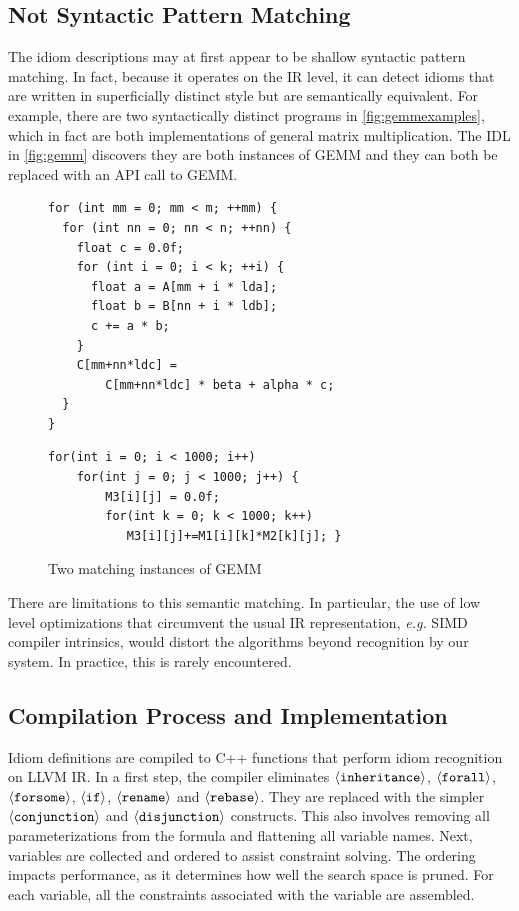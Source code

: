 \subsection{Not Syntactic Pattern Matching}
The idiom descriptions may at first appear to be shallow syntactic pattern matching.
In fact, because it operates on the IR level, it can detect idioms that are written in superficially distinct style but are semantically equivalent.
For example, there are two syntactically distinct programs in \autoref{fig:gemmexamples}, which in fact are both implementations of general matrix multiplication.
The IDL in \autoref{fig:gemm} discovers they are both instances of GEMM and they can both be replaced with an API call to GEMM.

\begin{figure}[ht]
\begin{lstlisting}[numbers=none,basicstyle=\linespread{1.133}\footnotesize\ttfamily]
for (int mm = 0; mm < m; ++mm) {
  for (int nn = 0; nn < n; ++nn) {
    float c = 0.0f;
    for (int i = 0; i < k; ++i) {
      float a = A[mm + i * lda]; 
      float b = B[nn + i * ldb];
      c += a * b;
    }
    C[mm+nn*ldc] =
        C[mm+nn*ldc] * beta + alpha * c;
  }
}
\end{lstlisting}
\vspace{1em}
\begin{lstlisting}[numbers=none,basicstyle=\linespread{1.133}\footnotesize\ttfamily]
for(int i = 0; i < 1000; i++)
    for(int j = 0; j < 1000; j++) {
        M3[i][j] = 0.0f;
        for(int k = 0; k < 1000; k++)
           M3[i][j]+=M1[i][k]*M2[k][j]; }
\end{lstlisting}
\vspace{-0.3cm}
\caption{Two matching instances of GEMM}
\label{fig:gemmexamples}
\end{figure}

There are limitations to this semantic matching.
In particular, the use of low level optimizations that circumvent the usual IR representation,
{\em e.g.}  SIMD compiler intrinsics, would distort the algorithms beyond recognition by our system.
In practice, this is rarely encountered.



\subsection{Compilation Process and Implementation}
\label{sec:compilation}
Idiom definitions are compiled to C++ functions that perform idiom recognition on LLVM IR.
In a first step, the compiler eliminates $\left<\text{\tt inheritance}\right>$, $\left<\text{\tt forall}\right>$, $\left<\text{\tt forsome}\right>$,
$\left<\text{\tt if}\right>$, $\left<\text{\tt rename}\right>$ and $\left<\text{\tt rebase}\right>$.
They are replaced with the simpler $\left<\text{\tt conjunction}\right>$ and $\left<\text{\tt disjunction}\right>$ constructs.
This also involves removing all parameterizations from the formula and flattening all variable names.
Next, variables are collected and ordered to assist constraint solving.
The ordering impacts performance, as it determines how well the search space is pruned. 
For each variable, all the constraints associated with the variable are assembled.

